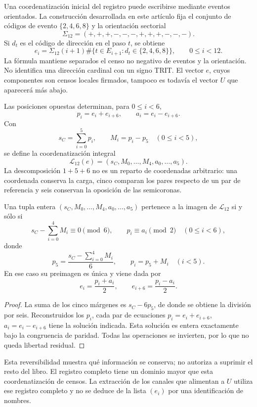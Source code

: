 Una coordenatización inicial del registro puede escribirse mediante eventos
orientados. La construcción desarrollada en este artículo fija el conjunto de códigos de evento
\(\{2,4,6,8\}\) y la orientación sectorial
\[
 \Sigma_{12}=(+,+,+,-,-,-,+,+,+,-,-,-).
\]
Si \(d_t\) es el código de dirección en el paso \(t\), se obtiene
\[
 e_i=\Sigma_{12}(i+1)
 \#\{t\in E_{i+1}:d_t\in\{2,4,6,8\}\},
 \qquad0\leq i<12.
\]
La fórmula mantiene separados el censo no negativo de eventos y la
orientación. No identifica una dirección cardinal con un signo TRIT. El
vector \(e\), cuyos componentes son censos locales firmados, tampoco es
todavía el vector \(U\) que aparecerá más abajo.

Las posiciones opuestas determinan, para \(0\leq i<6\),
\[
 p_i=e_i+e_{i+6},\qquad a_i=e_i-e_{i+6}.
\]
Con
\[
 s_C=\sum_{i=0}^{5}p_i,\qquad M_i=p_i-p_5\quad(0\leq i<5),
\]
se define la coordenatización integral
\[
 \mathcal L_{12}(e)
 =(s_C,M_0,\ldots,M_4,a_0,\ldots,a_5).
\]
La descomposición \(1+5+6\) no es un reparto de coordenadas arbitrario:
una coordenada conserva la carga, cinco comparan los pares respecto de un
par de referencia y seis conservan la oposición de las semicoronas.

\begin{lemma}
\label{lem:k-carta-integral}
Una tupla entera \((s_C,M_0,\ldots,M_4,a_0,\ldots,a_5)\) pertenece a la
imagen de \(\mathcal L_{12}\) si y sólo si
\[
 s_C-\sum_{i=0}^{4}M_i\equiv0\pmod6,
 \qquad p_i\equiv a_i\pmod2\quad(0\leq i<6),
\]
donde
\[
 p_5=\frac{s_C-\sum_{i=0}^{4}M_i}{6},\qquad p_i=p_5+M_i\quad(i<5).
\]
En ese caso su preimagen es única y viene dada por
\[
 e_i=\frac{p_i+a_i}{2},\qquad e_{i+6}=\frac{p_i-a_i}{2}.
\]
\end{lemma}

\begin{proof}
La suma de los cinco márgenes es \(s_C-6p_5\), de donde se obtiene la
división por seis. Reconstruidos los \(p_i\), cada par de ecuaciones
\(p_i=e_i+e_{i+6}\), \(a_i=e_i-e_{i+6}\) tiene la solución indicada.
Esta solución es entera exactamente bajo la congruencia de paridad. Todas
las operaciones se invierten, por lo que no queda libertad residual.
\end{proof}

Esta reversibilidad muestra qué información se conserva; no autoriza a
suprimir el resto del libro. El registro completo tiene un dominio mayor
que esta coordenatización de censos. La extracción de los canales que alimentan a
\(U\) utiliza ese registro completo y no se deduce de la lista
\((e_i)\) por una identificación de nombres.

